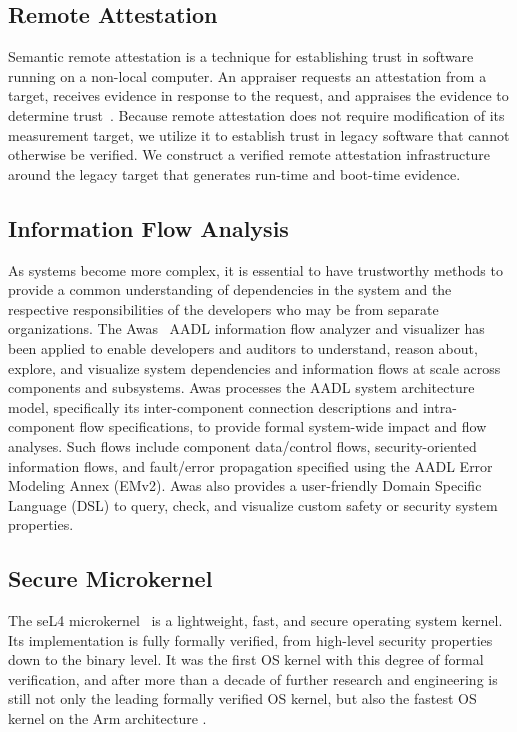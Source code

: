 \subsection{Remote Attestation}

Semantic remote attestation is a technique for establishing trust in software running on a non-local computer.  
An appraiser requests an attestation from a target, receives evidence in response to the request, and appraises
the evidence to determine trust~\cite{Coker::Principles-of-R}.
Because remote attestation does not require modification of its measurement target, we utilize it to establish trust in legacy software that cannot otherwise be verified.
We construct a verified remote attestation infrastructure around the legacy target that generates run-time and boot-time evidence.

\subsection{Information Flow Analysis}

As systems become more complex, it is essential to have trustworthy methods to provide a common understanding of dependencies in the system and the respective responsibilities of the developers who may be from separate organizations.  
%
The Awas~\cite{awas} AADL information flow analyzer and visualizer has been applied to enable developers and auditors to understand, reason about, explore, and visualize system dependencies and information flows at scale across components and subsystems.
Awas processes the AADL system architecture model, specifically its inter-component connection descriptions and intra-component flow specifications, to provide formal system-wide impact and flow analyses.
Such flows include component data/control flows, security-oriented information flows, and fault/error propagation specified using the AADL Error Modeling Annex (EMv2).
Awas also provides a user-friendly Domain Specific Language (DSL) to query, check, and visualize custom safety or security system properties.

\subsection{Secure Microkernel}

The seL4 microkernel~\cite{sel4-sosp09} is a lightweight, fast, and secure operating system kernel.
Its implementation is fully formally verified, from high-level security properties down to the binary level.
It was the first OS kernel with this degree of formal verification, and after more than a decade of further research and engineering is still not only the leading formally verified OS kernel, but also the fastest OS kernel on the Arm architecture \cite{sel4-tocs14}. 

